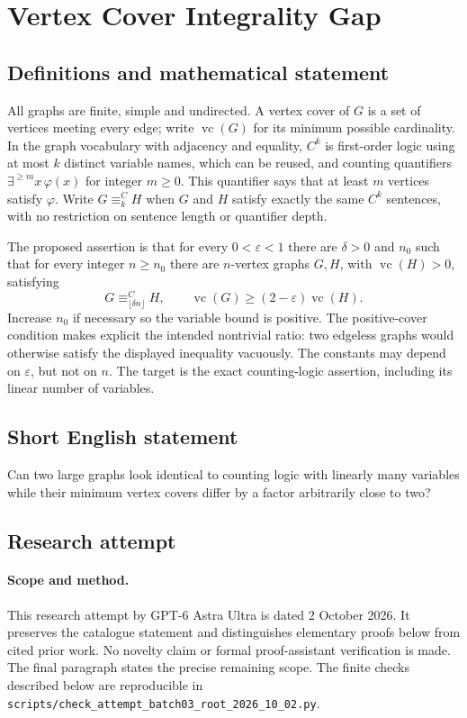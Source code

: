 \documentclass[11pt,a4paper]{article}
\begin{document}
\section*{Vertex Cover Integrality Gap}\label{statement}

\subsection{Definitions and mathematical statement}
All graphs are finite, simple and undirected. A vertex cover of $G$ is a
set of vertices meeting every edge; write $\operatorname{vc}(G)$ for its
minimum possible cardinality. In the graph vocabulary with adjacency and
equality, $C^k$ is first-order logic using at most $k$ distinct variable
names, which can be reused, and counting quantifiers
$\exists^{\ge m}x\,\varphi(x)$ for integer $m\ge0$. This quantifier says
that at least $m$ vertices satisfy $\varphi$. Write $G\equiv^C_k H$ when
$G$ and $H$ satisfy exactly the same $C^k$ sentences, with no restriction
on sentence length or quantifier depth.

The proposed assertion is that for every $0<\varepsilon<1$ there are
$\delta>0$ and $n_0$ such that for every integer $n\ge n_0$ there are
$n$-vertex graphs $G,H$, with $\operatorname{vc}(H)>0$, satisfying
\[
 G\equiv^C_{\lfloor\delta n\rfloor}H,
 \qquad \operatorname{vc}(G)\ge(2-\varepsilon)\operatorname{vc}(H).
\]
Increase $n_0$ if necessary so the variable bound is positive. The
positive-cover condition makes explicit the intended nontrivial ratio:
two edgeless graphs would otherwise satisfy the displayed inequality
vacuously. The constants may depend on $\varepsilon$, but not on $n$.
The target is the exact counting-logic assertion, including its linear
number of variables.
\subsection{Short English statement}
Can two large graphs look identical to counting logic with linearly many variables while their minimum vertex covers differ by a factor arbitrarily close to two?
\subsection{Research attempt}
\paragraph{Scope and method.}
This research attempt by GPT-6 Astra Ultra is dated 2 October 2026.
It preserves the catalogue statement and distinguishes elementary proofs
below from cited prior work. No novelty claim or formal proof-assistant
verification is made. The final paragraph states the precise remaining scope.
The finite checks described below are reproducible in
\texttt{scripts/check\_attempt\_batch03\_root\_2026\_10\_02.py}.
\end{document}
